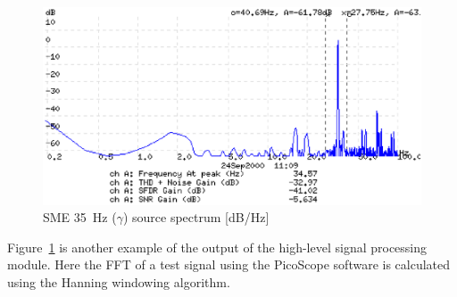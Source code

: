 \begin{figure}[htbp]
\begin{center}
	\includegraphics[width=\textwidth]{SME351.ps}
    \caption{SME 35~Hz ($\gamma$) source spectrum [dB/Hz]}
    \label{fig:sme35-1}
\end{center}
\end{figure}

Figure~\ref{fig:sme35-1} is another example of the output of the
high-level signal processing module. Here the FFT of a test signal
using the PicoScope software is calculated using the Hanning windowing
algorithm.

